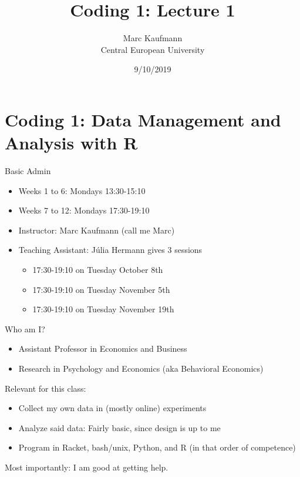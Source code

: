 \documentclass[ignorenonframetext,]{beamer}
\title{Coding 1: Lecture 1}
\author{Marc Kaufmann\\
Central European University}
\date{9/10/2019}
\providecommand{\tightlist}{%
  \setlength{\itemsep}{0pt}\setlength{\parskip}{0pt}}
\begin{document}
\frame{\titlepage}

\hypertarget{coding-1-data-management-and-analysis-with-r}{%
\section{Coding 1: Data Management and Analysis with
R}\label{coding-1-data-management-and-analysis-with-r}}

\begin{frame}{Basic Admin}
\protect\hypertarget{basic-admin}{}

\begin{itemize}
\tightlist
\item
  Weeks 1 to 6: Mondays 13:30-15:10
\item
  Weeks 7 to 12: Mondays 17:30-19:10
\item
  Instructor: Marc Kaufmann (call me Marc)
\item
  Teaching Assistant: Júlia Hermann gives 3 sessions

  \begin{itemize}
  \tightlist
  \item
    17:30-19:10 on Tuesday October 8th
  \item
    17:30-19:10 on Tuesday November 5th
  \item
    17:30-19:10 on Tuesday November 19th
  \end{itemize}
\end{itemize}

\end{frame}

\begin{frame}{Who am I?}
\protect\hypertarget{who-am-i}{}

\pause{}

\begin{itemize}
\tightlist
\item
  Assistant Professor in Economics and Business
\item
  Research in Psychology and Economics (aka Behavioral Economics)
\end{itemize}

\pause{}

Relevant for this class:

\begin{itemize}
\tightlist
\item
  Collect my own data in (mostly online) experiments
\item
  Analyze said data: Fairly basic, since design is up to me
\item
  Program in Racket, bash/unix, Python, and R (in that order of
  competence)
\end{itemize}

\pause{}

Most importantly: I am good at getting help.

\end{frame}
\end{document}
